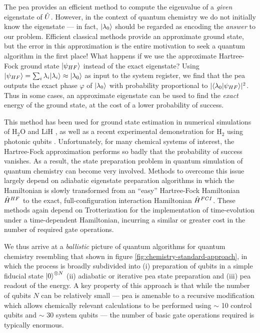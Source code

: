 The \gls{pea} provides an efficient method to compute the eigenvalue of a \emph{given} eigenstate of $\hat{U}$. However, in the context of quantum chemistry we do not initially know the eigenstate --- in fact, $\mbox{$ | \lambda_0 \rangle $}$ should be regarded as encoding the \emph{answer} to our problem. Efficient classical methods provide an approximate ground state, but the error in this approximation is the entire motivation to seek a quantum algorithm in the first place!  What happens if we use the approximate Hartree-Fock ground state $\mbox{$ | \psi_{HF} \rangle $}$ instead of the exact eigenstate?  Using $\mbox{$ | \psi_{HF} \rangle $} = \sum_i \lambda_i \mbox{$ | \lambda_i \rangle $} \approx \mbox{$ | \lambda_0 \rangle $}$ as input to the system register, we find \cite{Nielsen2004} that the \gls{pea} outputs the exact phase $\varphi$ of $\mbox{$ | \lambda_0 \rangle $}$ with probability proportional to $|\langle \lambda_0 | \psi_{HF} \rangle|^2$. Thus in some cases, an approximate eigenstate can be used to find the \emph{exact} energy of the ground state, at the cost of a lower probability of success. 

This method has been used for ground state estimation in numerical simulations of $\mathrm{H_2O}$ \cite{Aspuru-Guzik2005, Wecker2013} and  LiH \cite{Aspuru-Guzik2005}, as well as a recent experimental demonstration for $\mathrm{H}_2$ using photonic qubits \cite{Lanyon2010}. Unfortunately, for many chemical systems of interest, the Hartree-Fock approximation performs so badly that the probability of success vanishes.  As a result, the state preparation problem in quantum simulation of quantum chemistry can become very involved.  Methods to overcome this issue largely depend on adiabatic eigenstate preparation algorithms \cite{Lloyd1996, Aspuru-Guzik2005} in which the Hamiltonian is slowly transformed from an ``easy'' Hartree-Fock Hamiltonian $\hat{H}^{HF}$ to the exact, full-configuration interaction Hamiltonian $\hat{H}^{FCI}$. These methods again depend on Trotterization for the implementation of time-evolution under a time-dependent Hamiltonian, incurring a similar or greater cost in the number of required gate operations.

We thus arrive at a \emph{ballistic} picture of quantum algorithms for quantum chemistry resembling that shown in figure \ref{fig:chemistry-standard-approach}, in which the process is broadly subdivided into (i) preparation of qubits in a simple fiducial state $\mbox{$ | 0 \rangle $}^{\otimes N}$ (ii) adiabatic or iterative \gls{pea} state preparation and (iii) \gls{pea} readout of the energy. A key property of this approach is that while the number of qubits $N$ can be relatively small --- \gls{pea} is amenable to a recursive modification which allows chemically relevant calculations to be performed using $\sim$ 10 control qubits and $\sim$ 30 system qubits --- the number of basic gate operations required is typically enormous. 

